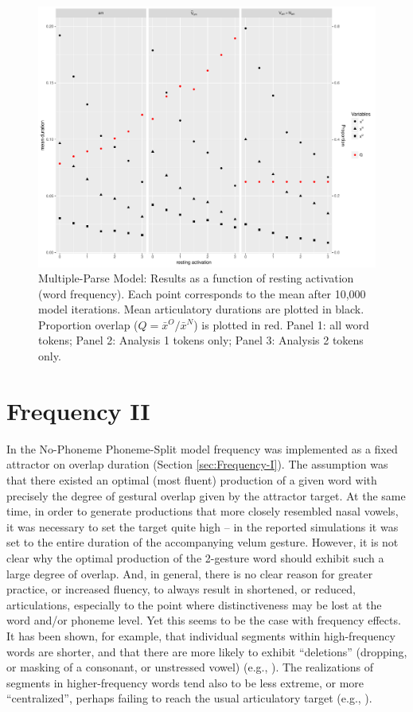 \begin{figure}[h]
\includegraphics[width=\textwidth]{figures/MultipleParseResults.pdf}
\caption{\label{fig:Multiple-Parse-Results}Multiple-Parse Model: Results as
a function of resting activation (word frequency). Each point corresponds
to the mean after 10,000 model iterations. Mean articulatory durations
are plotted in black. Proportion overlap ($Q={\bar{x}^{O}}/{\bar{x}^{N}}$)
is plotted in red. Panel 1: all word tokens; Panel 2: Analysis 1 tokens
only; Panel 3: Analysis 2 tokens only.}
\end{figure}


\section{\label{sec:Frequency-II}Frequency II}

In the No-Phoneme Phoneme-Split model frequency was implemented as
a fixed attractor on overlap duration (Section \ref{sec:Frequency-I}).
The assumption was that there existed an optimal (most fluent) production
of a given word with precisely the degree of gestural overlap given
by the attractor target. At the same time, in order to generate productions
that more closely resembled nasal vowels, it was necessary to set
the target quite high – in the reported simulations it was set to
the entire duration of the accompanying velum gesture. However, it
is not clear why the optimal production of the 2-gesture word should
exhibit such a large degree of overlap. And, in general, there is
no clear reason for greater practice, or increased fluency, to always
result in shortened, or reduced, articulations, especially to the
point where distinctiveness may be lost at the word and/or phoneme
level. Yet this seems to be the case with frequency effects. It has
been shown, for example, that individual segments within high-frequency
words are shorter, and that there are more likely to exhibit “deletions”
(dropping, or masking of a consonant, or unstressed vowel) (e.g.,
\citealt{Bell2003,Raymond2006,Bybee2008}). The realizations of segments
in higher-frequency words tend also to be less extreme, or more “centralized”,
perhaps failing to reach the usual articulatory target (e.g., \citealt{munson2004effect,Scarborough2004,gahl2008time}).


